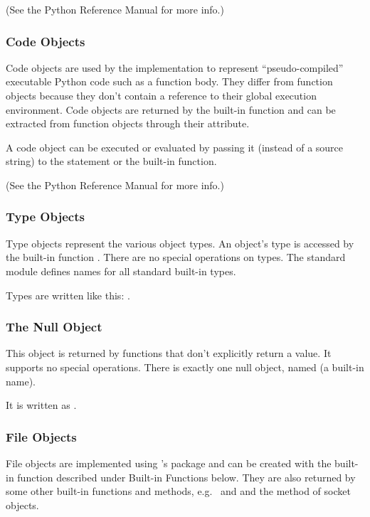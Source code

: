 (See the Python Reference Manual for more info.)

\subsubsection{Code Objects}

Code objects are used by the implementation to represent
``pseudo-compiled'' executable Python code such as a function body.
They differ from function objects because they don't contain a
reference to their global execution environment.  Code objects are
returned by the built-in  function and can be
extracted from function objects through their 
attribute.

A code object can be executed or evaluated by passing it (instead of a
source string) to the  statement or the built-in
 function.

(See the Python Reference Manual for more info.)

\subsubsection{Type Objects}

Type objects represent the various object types.  An object's type is
accessed by the built-in function .  There are no special
operations on types.  The standard module  defines names
for all standard built-in types.

Types are written like this: .

\subsubsection{The Null Object}

This object is returned by functions that don't explicitly return a
value.  It supports no special operations.  There is exactly one null
object, named  (a built-in name).

It is written as .

\subsubsection{File Objects}

File objects are implemented using \C{}'s  package and can be
created with the built-in function  described under
Built-in Functions below.  They are also returned by some other
built-in functions and methods, e.g.\  and
 and the  method of socket
objects.

